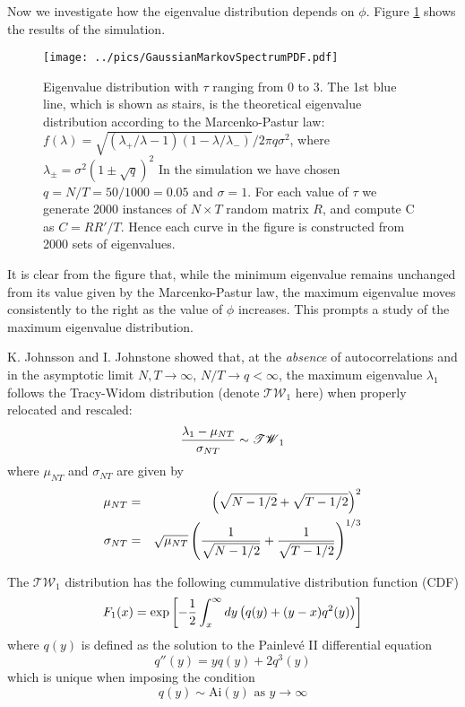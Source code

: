\documentclass{book}
\begin{document}
Now we investigate how the eigenvalue distribution depends on
$\phi$. Figure \ref{fig:GaussianMarkovSpectrumPDF} shows the results
of the simulation.
\begin{figure}[htb!]
  \begin{center}
    \texttt{[image: ../pics/GaussianMarkovSpectrumPDF.pdf]}
  \end{center}
  \vspace{-10mm}
  \label{fig:GaussianMarkovSpectrumPDF}
  \caption{\footnotesize{
    Eigenvalue distribution with $\tau$ ranging from 0 to
    3. The 1st blue line, which is shown as stairs, is the
    theoretical eigenvalue distribution according to the
    Marcenko-Pastur law: $f(\lambda) = \sqrt{(\lambda_+/\lambda - 1)(1
      - \lambda/\lambda_-)}/2\pi q \sigma^2$, where $\lambda_{\pm} =
    \sigma^2(1 \pm \sqrt{q})^2$ In the simulation we have
    chosen $q = N/T = 50/1000 = 0.05$ and $\sigma=1$. For each value
    of $\tau$ we generate 2000 instances of $N \times T$ random matrix
    $R$, and compute C as $C=RR'/T$. Hence each curve in the figure is
    constructed from 2000 sets of eigenvalues.
  }}
\end{figure}
It is clear from the figure that, while the minimum eigenvalue remains
unchanged from its value given by the Marcenko-Pastur law, the maximum
eigenvalue moves consistently to the right as the value of $\phi$
increases. This prompts a study of the maximum eigenvalue distribution.

K. Johnsson \cite{Johnsson2000} and I. Johnstone \cite{Johnstone2001}
showed that, at the {\it absence} of autocorrelations and in the asymptotic
limit $N, T \to \infty$, $N/T \to q < \infty$, the maximum eigenvalue
$\lambda_1$ follows the Tracy-Widom distribution (denote
$\mathscr{TW}_1$ here) when properly relocated and rescaled:
\begin{equation*}
  {\lambda_1 - \mu_{NT} \over \sigma_{NT}} \sim \mathscr{TW}_1
\end{equation*}
where $\mu_{NT}$ and $\sigma_{NT}$ are given by
\begin{eqnarray*}
  \mu_{NT} &=& \left(
    \sqrt{N-1/2} + \sqrt{T - 1/2}
  \right)^2 \\
  \sigma_{NT} &=& \sqrt{\mu_{NT}} \left(
    {1 \over \sqrt{N-1/2}} + {1 \over \sqrt{T-1/2}}
  \right)^{1/3}
\end{eqnarray*}

The $\mathscr{TW}_1$ distribution has the following cummulative
distribution function (CDF) \cite{Chiani2012}
\begin{equation*}
  F_1(x) = \exp\left[
    -{1 \over 2} \int_x^\infty dy \left(q(y) + (y-x)q^2(y)\right)
  \right]
\end{equation*}
where $q(y)$ is defined as the solution to the Painlev\'e II differential
equation
\begin{equation*}
  q''(y) = yq(y) + 2q^3(y)
\end{equation*}
which is unique when imposing the condition
\begin{equation*}
  q(y) \sim \text{Ai}(y) \text{ as } y \to \infty
\end{equation*}
\end{document}
